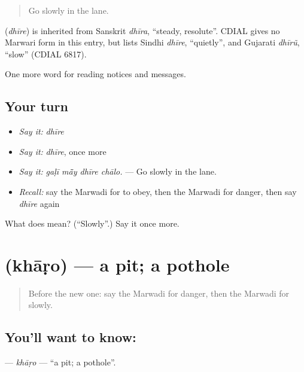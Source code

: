 \begin{quote}
Go slowly in the lane.
\end{quote}

\begin{cousinweb}
\textbf{} (\emph{dhīre}) is inherited from Sanskrit \emph{dhīra}, \textquotedblleft{}steady, resolute\textquotedblright{}. CDIAL gives no Marwari form in this entry, but lists Sindhi \emph{dhīre}, \textquotedblleft{}quietly\textquotedblright{}, and Gujarati \emph{dhīrũ}, \textquotedblleft{}slow\textquotedblright{} (CDIAL 6817).
\end{cousinweb}

\begin{grammarlens}[title={What you've built}]
One more word for reading notices and messages.
\end{grammarlens}

\subsection*{Your turn}
\begin{itemize}
\raggedright
  \item \emph{Say it:} \emph{dhīre}
  \item \emph{Say it:} \emph{dhīre}, once more
  \item \emph{Say it:} \emph{gaḷī mā̃y dhīre chālo.} — Go slowly in the lane.
  \item \emph{Recall:} say the Marwadi for to obey, then the Marwadi for danger, then say \emph{dhīre} again
\end{itemize}

\begin{tcolorbox}[breakable,colback=teal!4,colframe=teal!35!black,title={Before you move on}]
What does  mean? (\textquotedblleft{}Slowly\textquotedblright{}.) Say it once more.
\end{tcolorbox}
\section[\texorpdfstring{\mw{खाड़ो} (khāṛo)}{खाड़ो (khāṛo)}]{ (khāṛo) — a pit; a pothole}

\label{lesson:MW-C192-kharo}



\begin{quote}
Before the new one: say the Marwadi for danger, then the Marwadi for slowly.
\end{quote}

\subsection*{You'll want to know: }
\textbf{} — \emph{khāṛo} — \textquotedblleft{}a pit; a pothole\textquotedblright{}.

